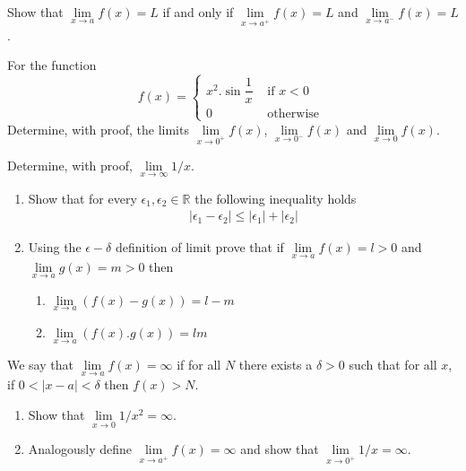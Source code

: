 \documentclass[9pt, a4paper, oneside]{amsart}
\begin{document}
\begin{questions}[resume]


	\item Show that $ \lim \limits_{x \rightarrow a} f(x) = L$ if and only if $ \lim \limits_{x \rightarrow a^+} f(x) = L$ and $ \lim \limits_{x \rightarrow a^-} f(x) = L$.


	\item For the function 	$$ f(x) = \begin{cases} x^2 .\sin {\dfrac{1}{x}} & \mbox{ if } x < 0 \\ 0 & \mbox{ otherwise }\end{cases}$$
	Determine, with proof, the limits $ \lim \limits_{x \rightarrow 0^+} f(x)$, $ \lim \limits_{x \rightarrow 0^-} f(x)$ and $ \lim \limits_{x \rightarrow 0} f(x)$.
	\item Determine, with proof, $\lim \limits_{x \rightarrow \infty} 1/x$.


	\item
	\begin{enumerate}
		\item Show that for every $ \epsilon_1, \epsilon_2 \in \mathbb{R}$ the following inequality holds
		      \begin{align*}
		      	|\epsilon_1 - \epsilon _ 2| \le |\epsilon_1| + |\epsilon_2|
		      \end{align*}
		\item Using the $\epsilon-\delta$ definition of limit prove that if $\lim \limits _ {x \rightarrow a} f(x) = l > 0$ and $\lim \limits _ {x \rightarrow a} g(x) = m > 0$ then
		      \begin{enumerate}
		      	\item $\lim \limits _ {x \rightarrow a} \left(f(x)- g(x)\right) = l-m$
		      	\item $\lim \limits _ {x \rightarrow a} \left(f(x). g(x)\right)  = lm$
		      \end{enumerate}
	\end{enumerate}


	\item 		We say that $ \lim \limits _ {x \rightarrow a} f(x) = \infty$ if for all $ N$ there exists a $ \delta > 0$ such that for all $ x$, if $ 0 < |x - a| < \delta$ then $ f(x) > N$.
	\begin{enumerate}

		\item Show that $ \lim \limits_{x \rightarrow 0} {1}/{x^2} = \infty$.

		\item Analogously define $ \lim \limits _ {x \rightarrow a^+} f(x) = \infty$ and show that $\lim \limits_{x \rightarrow 0^+} 1/x = \infty$.


\end{enumerate}
\end{questions}
\end{document}
